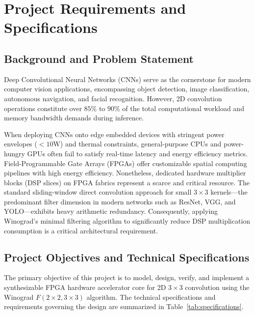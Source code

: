 \documentclass[12pt,a4paper]{article}
\begin{document}
\newpage
\tableofcontents
\newpage
\listoffigures
\vspace{0.5cm}
\listoftables

\newpage
{}
\setcounter{page}{1}

\section{Project Requirements and Specifications}
\label{sec:requirements}

\subsection{Background and Problem Statement}
Deep Convolutional Neural Networks (CNNs) serve as the cornerstone for modern computer vision applications, encompassing object detection, image classification, autonomous navigation, and facial recognition. However, 2D convolution operations constitute over $85\%$ to $90\%$ of the total computational workload and memory bandwidth demands during inference.

When deploying CNNs onto edge embedded devices with stringent power envelopes ($< 10\text{W}$) and thermal constraints, general-purpose CPUs and power-hungry GPUs often fail to satisfy real-time latency and energy efficiency metrics. Field-Programmable Gate Arrays (FPGAs) offer customizable spatial computing pipelines with high energy efficiency. Nonetheless, dedicated hardware multiplier blocks (DSP slices) on FPGA fabrics represent a scarce and critical resource. The standard sliding-window direct convolution approach for small $3 \times 3$ kernels—the predominant filter dimension in modern networks such as ResNet, VGG, and YOLO—exhibits heavy arithmetic redundancy. Consequently, applying Winograd's minimal filtering algorithm to significantly reduce DSP multiplication consumption is a critical architectural requirement.

\subsection{Project Objectives and Technical Specifications}
The primary objective of this project is to model, design, verify, and implement a synthesizable FPGA hardware accelerator core for 2D $3 \times 3$ convolution using the Winograd $F(2 \times 2, 3 \times 3)$ algorithm. The technical specifications and requirements governing the design are summarized in Table~\ref{tab:specifications}.
\end{document}
